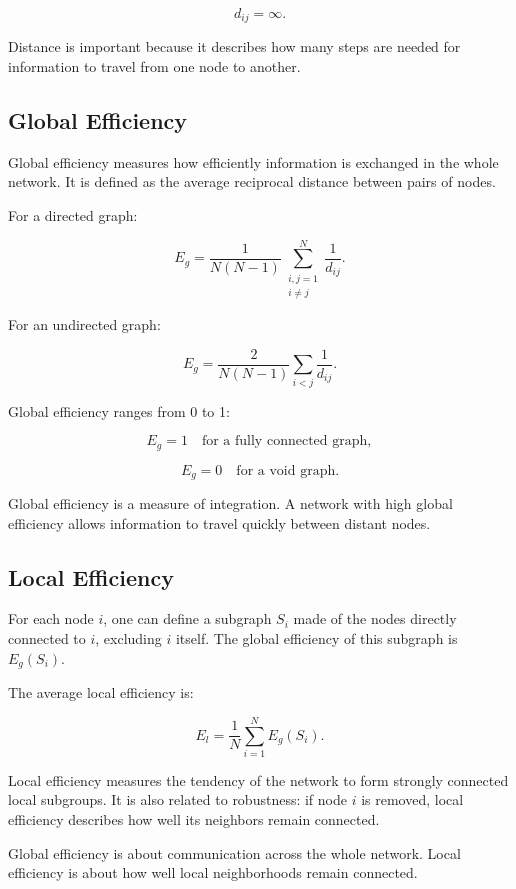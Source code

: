 \[
d_{ij} = \infty.
\]

Distance is important because it describes how many steps are needed for information to travel from one node to another.

\subsection{Global Efficiency}

Global efficiency measures how efficiently information is exchanged in the whole network. It is defined as the average reciprocal distance between pairs of nodes.

For a directed graph:

\[
E_g =
\frac{1}{N(N-1)}
\sum_{\substack{i,j=1 \\ i \neq j}}^{N}
\frac{1}{d_{ij}}.
\]

For an undirected graph:

\[
E_g =
\frac{2}{N(N-1)}
\sum_{i<j}
\frac{1}{d_{ij}}.
\]

Global efficiency ranges from 0 to 1:

\[
E_g = 1
\quad \text{for a fully connected graph},
\]

\[
E_g = 0
\quad \text{for a void graph}.
\]

\begin{authornote}
Global efficiency is a measure of integration. A network with high global efficiency allows information to travel quickly between distant nodes.
\end{authornote}

\subsection{Local Efficiency}

For each node $i$, one can define a subgraph $S_i$ made of the nodes directly connected to $i$, excluding $i$ itself. The global efficiency of this subgraph is $E_g(S_i)$.

The average local efficiency is:

\[
E_l =
\frac{1}{N}
\sum_{i=1}^{N}
E_g(S_i).
\]

Local efficiency measures the tendency of the network to form strongly connected local subgroups. It is also related to robustness: if node $i$ is removed, local efficiency describes how well its neighbors remain connected.

\begin{authornote}
Global efficiency is about communication across the whole network. Local efficiency is about how well local neighborhoods remain connected.
\end{authornote}

